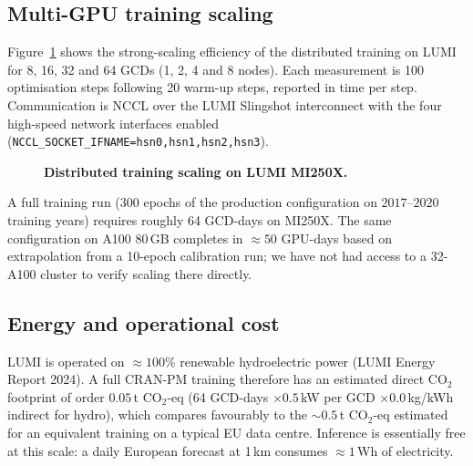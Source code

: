 \subsection{Multi-GPU training scaling}
\label{sec:perf:scaling}

Figure~\ref{fig:scaling} shows the strong-scaling efficiency of the
distributed training on LUMI for 8, 16, 32 and 64 GCDs (1, 2, 4
and 8 nodes). Each measurement is 100 optimisation steps following
20 warm-up steps, reported in time per step. Communication is
NCCL over the LUMI Slingshot interconnect with the four high-speed
network interfaces enabled (\texttt{NCCL\_SOCKET\_IFNAME=hsn0,hsn1,hsn2,hsn3}).

\begin{figure}[!ht]
  \centering
  \caption{\textbf{Distributed training scaling on LUMI MI250X.}}
  \label{fig:scaling}
\end{figure}

A full training run (300 epochs of the production configuration on
$2017$--$2020$ training years) requires roughly 64 GCD-days on
MI250X. The same configuration on A100 80\,GB completes in
$\approx 50$ GPU-days based on extrapolation from a 10-epoch
calibration run; we have not had access to a 32-A100 cluster to
verify scaling there directly.

\subsection{Energy and operational cost}

LUMI is operated on $\approx 100\%$ renewable hydroelectric power
(LUMI Energy Report 2024). A full CRAN-PM training therefore has
an estimated direct CO$_2$ footprint of order $0.05$\,t CO$_2$-eq
(64 GCD-days $\times 0.5$\,kW per GCD $\times 0.0$\,kg/kWh
indirect for hydro), which compares favourably to the $\sim 0.5$\,t
CO$_2$-eq estimated for an equivalent training on a typical EU
data centre. Inference is essentially free at this scale: a daily
European forecast at 1\,km consumes $\approx 1$\,Wh of electricity.
